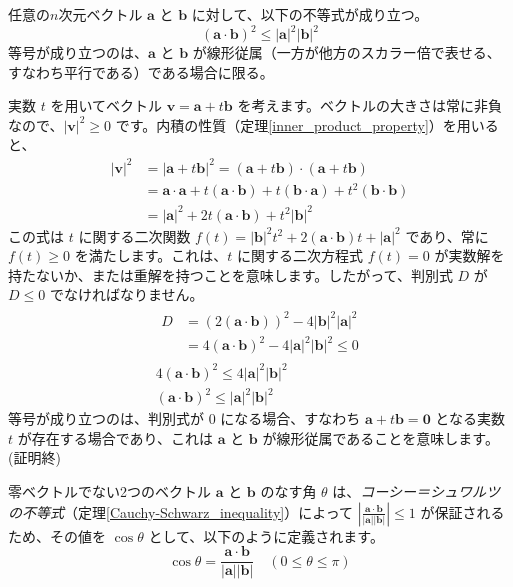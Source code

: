 \begin{thm} \label{Cauchy-Schwarz_inequality}
任意の$n$次元ベクトル $\bm{a}$ と $\bm{b}$ に対して、以下の不等式が成り立つ。
\[(\bm{a} \cdot \bm{b})^2 \le |\bm{a}|^2 |\bm{b}|^2\]
等号が成り立つのは、$\bm{a}$ と $\bm{b}$ が線形従属（一方が他方のスカラー倍で表せる、すなわち平行である）である場合に限る。
\begin{proof*}
実数 $t$ を用いてベクトル $\bm{v} = \bm{a} + t\bm{b}$ を考えます。ベクトルの大きさは常に非負なので、$|\bm{v}|^2 \ge 0$ です。内積の性質（定理\ref{inner_product_property}）を用いると、
\begin{align*}
|\bm{v}|^2 &= |\bm{a} + t\bm{b}|^2 = (\bm{a} + t\bm{b}) \cdot (\bm{a} + t\bm{b})\\
&= \bm{a} \cdot \bm{a} + t(\bm{a} \cdot \bm{b}) + t(\bm{b} \cdot \bm{a}) + t^2(\bm{b} \cdot \bm{b})\\
&= |\bm{a}|^2 + 2t(\bm{a} \cdot \bm{b}) + t^2|\bm{b}|^2
\end{align*}
この式は $t$ に関する二次関数 $f(t) = |\bm{b}|^2 t^2 + 2(\bm{a} \cdot \bm{b}) t + |\bm{a}|^2$ であり、常に $f(t) \ge 0$ を満たします。これは、$t$ に関する二次方程式 $f(t) = 0$ が実数解を持たないか、または重解を持つことを意味します。したがって、判別式 $D$ が $D \le 0$ でなければなりません。
\begin{gather*}
\begin{aligned}
D &= (2(\bm{a} \cdot \bm{b}))^2 - 4|\bm{b}|^2 |\bm{a}|^2\\
&= 4(\bm{a} \cdot \bm{b})^2 - 4|\bm{a}|^2 |\bm{b}|^2 \le 0
\end{aligned}\\
4(\bm{a} \cdot \bm{b})^2 \le 4|\bm{a}|^2 |\bm{b}|^2\\
(\bm{a} \cdot \bm{b})^2 \le |\bm{a}|^2 |\bm{b}|^2
\end{gather*}
等号が成り立つのは、判別式が $0$ になる場合、すなわち $\bm{a} + t\bm{b} = \bm{0}$ となる実数 $t$ が存在する場合であり、これは $\bm{a}$ と $\bm{b}$ が線形従属であることを意味します。(証明終)
\end{proof*}
\end{thm}

\begin{dfn} \label{cosine}
零ベクトルでない2つのベクトル $\bm{a}$ と $\bm{b}$ のなす角 $\theta$ は、\emph{コーシー＝シュワルツの不等式}（定理\ref{Cauchy-Schwarz_inequality}）によって $\left| \frac{\bm{a} \cdot \bm{b}}{|\bm{a}| |\bm{b}|} \right| \le 1$ が保証されるため、その値を $\cos\theta$ として、以下のように定義されます。
\[\cos\theta = \frac{\bm{a} \cdot \bm{b}}{|\bm{a}| |\bm{b}|} \quad (0 \le \theta \le \pi)\]
\end{dfn}

